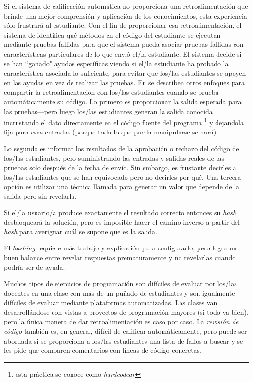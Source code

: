 Si el sistema de calificación automática no proporciona una retroalimentación que brinde una mejor comprensión y aplicación de los conocimientos, esta experiencia sólo frustrará al estudiante.
Con el fin de proporcionar esa retroalimentación, 
el sistema de \cite{Buff2015} identifica qué métodos en el código del estudiante se ejecutan mediante pruebas fallidas 
para que el sistema pueda asociar pruebas fallidas con características particulares de lo que envió el/la estudiante.
El sistema decide si se han ``ganado" ayudas específicas viendo si el/la estudiante ha probado la característica asociada lo suficiente, para evitar que los/las estudiantes se apoyen en las ayudas en vez de realizar las pruebas.
En \cite{Srid2016} se describen otros enfoques para compartir la retroalimentación con los/las estudiantes 
cuando se prueba automáticamente su código.
Lo primero es proporcionar la salida esperada para las pruebas---pero 
luego los/las estudiantes generan la salida conocida incrustando el dato directamente en el código fuente del programa \footnote{esta práctica se conoce como \emph{hardcodear}} y dejandola fija para esas entradas
(porque todo lo que pueda manipularse se hará).

Lo segundo es informar los resultados de la aprobación o rechazo del código de los/las estudiantes, 
pero suministrando las entradas y salidas reales de las pruebas solo después de la fecha de envío.
Sin embargo, 
es frustante decirles a los/las estudiantes que se han equivocado pero no decirles por qué.
Una tercera opción es utilizar una técnica llamada  para generar un valor que depende de la salida pero sin revelarla.

Si el/la usuario/a produce exactamente el resultado correcto
entonces su \emph{hash} desbloqueará la solución, 
pero es imposible hacer el camino inverso a partir del \emph{hash} para averiguar cuál se supone que es la salida.

El \emph{hashing} requiere más trabajo y explicación para configurarlo, 
pero logra un buen balance entre revelar respuestas prematuramente  y no revelarlas cuando podría ser de ayuda.


Muchos tipos de ejercicios de programación son difíciles de evaluar por los/las docentes en una clase con más de un puñado de estudiantes y son igualmente difíciles de evaluar mediante plataformas automatizadas.
Las clases van desarrollándose con vistas a proyectos de programación mayores (si todo va bien), 
pero la única manera de dar retroalimentación es caso por caso.
La \emph{revisión de código} también es, en general, difícil de calificar automáticamente,
pero puede ser abordada si se proporciona a los/las estudiantes una lista de fallos a buscar y se les pide que comparen comentarios con líneas de código concretas.


